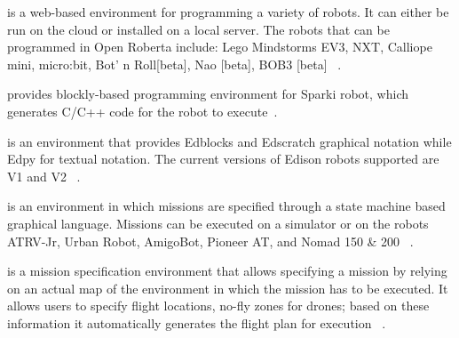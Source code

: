 \parhead{\openroberta} is a web-based environment for programming a variety of robots. It can either be run on the cloud  or installed on a local server. The  robots that can be programmed in Open Roberta include: Lego Mindstorms EV3, NXT, Calliope mini, micro:bit, Bot' n Roll[beta], Nao [beta], BOB3 [beta] ~\cite{OpenRoberta,Jost2015,Ketterl2015}. %

\parhead{\arcbotics} provides blockly-based  programming environment for Sparki robot, which generates C/C++ code for the robot to execute~\cite{ArcboticSparki}. %

\parhead{\edison} is an environment that provides Edblocks and Edscratch graphical notation while Edpy for textual notation. The current versions of Edison robots supported are V1 and V2 ~\cite{Edison}.%

\parhead{\missionlab} is an environment in which missions are specified through a state machine based graphical language. Missions can be executed on a simulator or on the robots ATRV-Jr, Urban Robot, AmigoBot, Pioneer AT, and Nomad 150 \& 200  ~\cite{arkin2002missionlab,Ulam2007}.%

\parhead{\flyaq} is a mission specification environment that allows specifying a mission by relying on an actual map of the environment in which the mission has to be executed. It allows users to specify  flight locations, no-fly zones for drones;  based on these information it automatically generates the flight plan for execution ~\cite{FLYAQ,DiRuscio2014,Bozhinoski2016}.%

